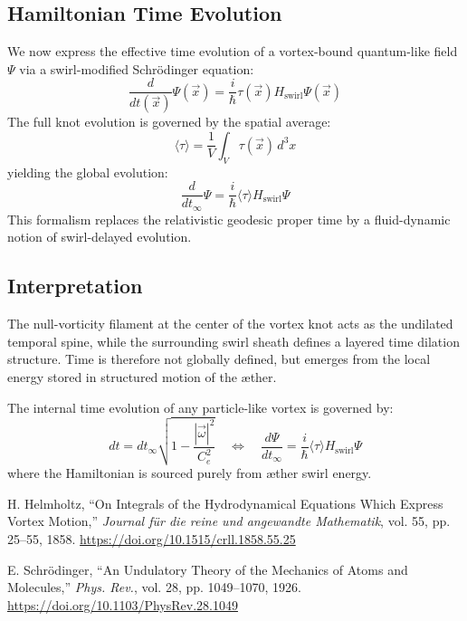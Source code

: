 \subsection{Hamiltonian Time Evolution}

We now express the effective time evolution of a vortex-bound quantum-like field \( \Psi \) via a swirl-modified Schrödinger equation:
\begin{equation}
    \frac{d}{dt(\vec{x})} \Psi(\vec{x}) = \frac{i}{\hbar} \tau(\vec{x}) H_{\text{swirl}} \Psi(\vec{x})
\end{equation}
The full knot evolution is governed by the spatial average:
\begin{equation}
    \langle \tau \rangle = \frac{1}{V} \int_V \tau(\vec{x}) \, d^3x
\end{equation}
yielding the global evolution:
\begin{equation}
    \frac{d}{dt_\infty} \Psi = \frac{i}{\hbar} \langle \tau \rangle H_{\text{swirl}} \Psi
\end{equation}
This formalism replaces the relativistic geodesic proper time by a fluid-dynamic notion of swirl-delayed evolution.

\subsection{Interpretation}

The null-vorticity filament at the center of the vortex knot acts as the undilated temporal spine, while the surrounding swirl sheath defines a layered time dilation structure. Time is therefore not globally defined, but emerges from the local energy stored in structured motion of the æther.

\begin{tcolorbox}[colback=gray!8, colframe=black!30, title=Swirl-Time Coupling in VAM]
    The internal time evolution of any particle-like vortex is governed by:
    \[
        dt = dt_\infty \sqrt{1 - \frac{|\vec{\omega}|^2}{C_e^2}} \quad \Longleftrightarrow \quad
        \frac{d\Psi}{dt_\infty} = \frac{i}{\hbar} \langle \tau \rangle H_{\text{swirl}} \Psi
    \]
    where the Hamiltonian is sourced purely from æther swirl energy.
\end{tcolorbox}


\begin{thebibliography}{99}
    H. Helmholtz, ``On Integrals of the Hydrodynamical Equations Which Express Vortex Motion,'' \textit{Journal für die reine und angewandte Mathematik}, vol. 55, pp. 25–55, 1858. \url{https://doi.org/10.1515/crll.1858.55.25}

    E. Schrödinger, ``An Undulatory Theory of the Mechanics of Atoms and Molecules,'' \textit{Phys. Rev.}, vol. 28, pp. 1049–1070, 1926. \url{https://doi.org/10.1103/PhysRev.28.1049}
\end{thebibliography}


